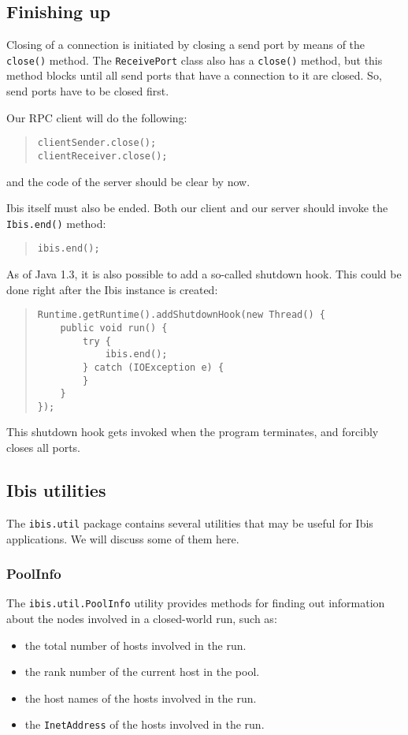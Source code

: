 \documentclass[10pt]{article}
\newcommand{\mysubsection}[1]{\subsection{#1}\label{#1}}
\newcommand{\mysubsubsection}[1]{\subsubsection{#1}\label{#1}}
\begin{document}
\subsection{Finishing up}

Closing of a connection is initiated by closing a send port
by means of the \texttt{close()} method. The \texttt{ReceivePort}
class also has a \texttt{close()} method, but this method blocks
until all send ports that have a connection to it are closed.
So, send ports have to be closed first.

Our RPC client will do the following:

\begin{quote}
\begin{verbatim}
clientSender.close();
clientReceiver.close();
\end{verbatim}
\end{quote}
and the code of the server should be clear by now.

Ibis itself must also be ended. Both our client and our server
should invoke the \texttt{Ibis.end()} method:
\begin{quote}
\begin{verbatim}
ibis.end();
\end{verbatim}
\end{quote}

As of Java 1.3, it is also possible to add a so-called shutdown hook.
This could be done right after the Ibis instance is created:
\begin{quote}
\begin{verbatim}
Runtime.getRuntime().addShutdownHook(new Thread() {
    public void run() {
        try {
            ibis.end();
        } catch (IOException e) {
        }
    }
});
\end{verbatim}
\end{quote}
\noindent
This shutdown hook gets invoked when the program terminates, and
forcibly closes all ports.

\mysubsection{Ibis utilities}

The \texttt{ibis.util} package contains several utilities that may be
useful for Ibis applications. We will discuss some of them here.

\mysubsubsection{PoolInfo}

The \texttt{ibis.util.PoolInfo} utility
provides methods for finding out information about the nodes
involved in a closed-world run, such as:
\begin{itemize}
\item
the total number of hosts involved in the run.
\item
the rank number of the current host in the pool.
\item
the host names of the hosts involved in the run.
\item
the \texttt{InetAddress} of the hosts involved in the run.
\end{itemize}
\end{document}
